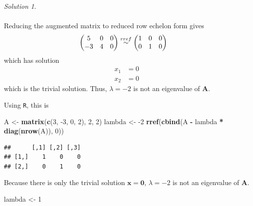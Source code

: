 \documentclass[
]{book}
\newenvironment{Shaded}{\begin{snugshade}}{\end{snugshade}}
\newcommand{\DecValTok}[1]{\textcolor[rgb]{0.00,0.00,0.81}{#1}}
\newcommand{\KeywordTok}[1]{\textcolor[rgb]{0.13,0.29,0.53}{\textbf{#1}}}
\newcommand{\NormalTok}[1]{#1}
\newcommand{\OperatorTok}[1]{\textcolor[rgb]{0.81,0.36,0.00}{\textbf{#1}}}
\newcommand{\StringTok}[1]{\textcolor[rgb]{0.31,0.60,0.02}{#1}}
\theoremstyle{definition}
\theoremstyle{definition}
\theoremstyle{definition}
\theoremstyle{definition}
\theoremstyle{remark}
\newtheorem*{solution}{Solution}
\begin{document}
\begin{solution}
\begin{enumerate}
\[\begin{aligned}
  \end{aligned}
  \]
  Reducing the augmented matrix to reduced row echelon form gives
  \[
  \begin{aligned}
  \begin{pmatrix} 5 & 0 & 0 \\ -3 & 4 & 0 \end{pmatrix} & \stackrel{rref}{\huge \sim} \begin{pmatrix} 1 & 0 & 0 \\ 0 & 1 & 0 \end{pmatrix}
  \end{aligned}
  \]
  which has solution
  \[
  \begin{aligned}
  x_1  & = 0 \\
  x_2  & = 0 
  \end{aligned}
  \]
  which is the trivial solution. Thus, \(\lambda = -2\) is not an eigenvalue of \(\mathbf{A}\).
\end{enumerate}

Using \texttt{R}, this is

\begin{Shaded}
\begin{Highlighting}[]
\NormalTok{A <-}\StringTok{  }\KeywordTok{matrix}\NormalTok{(}\KeywordTok{c}\NormalTok{(}\DecValTok{3}\NormalTok{, }\DecValTok{-3}\NormalTok{, }\DecValTok{0}\NormalTok{, }\DecValTok{2}\NormalTok{), }\DecValTok{2}\NormalTok{, }\DecValTok{2}\NormalTok{)}
\NormalTok{lambda <-}\StringTok{ }\DecValTok{-2}
\KeywordTok{rref}\NormalTok{(}\KeywordTok{cbind}\NormalTok{(A }\OperatorTok{-}\StringTok{ }\NormalTok{lambda }\OperatorTok{*}\StringTok{ }\KeywordTok{diag}\NormalTok{(}\KeywordTok{nrow}\NormalTok{(A)), }\DecValTok{0}\NormalTok{))}
\end{Highlighting}
\end{Shaded}

\begin{verbatim}
##      [,1] [,2] [,3]
## [1,]    1    0    0
## [2,]    0    1    0
\end{verbatim}

Because there is only the trivial solution \(\mathbf{x} = \mathbf{0}\), \(\lambda = -2\) is not an eigenvalue of \(\mathbf{A}\).

\begin{Shaded}
\begin{Highlighting}[]
\NormalTok{lambda <-}\StringTok{ }\DecValTok{1}
\end{Highlighting}
\end{Shaded}


\end{solution}
\end{document}
